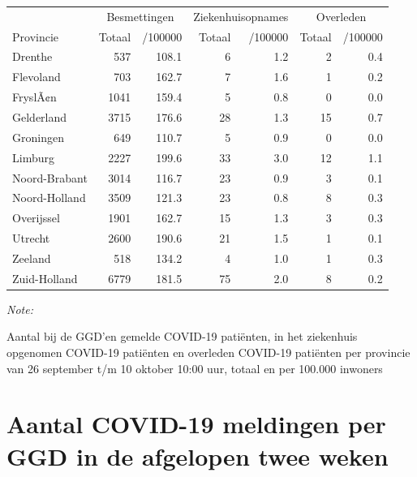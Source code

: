 \documentclass[
  english,
  man,floatsintext]{apa6}
\begin{document}
\begin{table}
\centering
\begin{threeparttable}
\begin{tabular}{lrrrrrr}
\toprule
\multicolumn{1}{c}{ } & \multicolumn{2}{c}{Besmettingen} & \multicolumn{2}{c}{Ziekenhuisopnames} & \multicolumn{2}{c}{Overleden} \\
\cmidrule(l{3pt}r{3pt}){2-3} \cmidrule(l{3pt}r{3pt}){4-5} \cmidrule(l{3pt}r{3pt}){6-7}
Provincie & Totaal & /100000 & Totaal & /100000 & Totaal & /100000\\
\midrule
Drenthe & 537 & 108.1 & 6 & 1.2 & 2 & 0.4\\
Flevoland & 703 & 162.7 & 7 & 1.6 & 1 & 0.2\\
FryslÃ¢n & 1041 & 159.4 & 5 & 0.8 & 0 & 0.0\\
Gelderland & 3715 & 176.6 & 28 & 1.3 & 15 & 0.7\\
Groningen & 649 & 110.7 & 5 & 0.9 & 0 & 0.0\\
Limburg & 2227 & 199.6 & 33 & 3.0 & 12 & 1.1\\
Noord-Brabant & 3014 & 116.7 & 23 & 0.9 & 3 & 0.1\\
Noord-Holland & 3509 & 121.3 & 23 & 0.8 & 8 & 0.3\\
Overijssel & 1901 & 162.7 & 15 & 1.3 & 3 & 0.3\\
Utrecht & 2600 & 190.6 & 21 & 1.5 & 1 & 0.1\\
Zeeland & 518 & 134.2 & 4 & 1.0 & 1 & 0.3\\
Zuid-Holland & 6779 & 181.5 & 75 & 2.0 & 8 & 0.2\\
\bottomrule
\end{tabular}
\begin{tablenotes}
\item \textit{Note: } 
\item Aantal bij de GGD’en gemelde COVID-19 patiënten, in het ziekenhuis opgenomen COVID-19 patiënten en overleden COVID-19 patiënten per provincie van 26 september t/m 10 oktober 10:00 uur, totaal en per 100.000 inwoners
\end{tablenotes}
\end{threeparttable}
\end{table}

\newpage

\hypertarget{aantal-covid-19-meldingen-per-ggd-in-de-afgelopen-twee-weken}{%
\section{Aantal COVID-19 meldingen per GGD in de afgelopen twee weken}\label{aantal-covid-19-meldingen-per-ggd-in-de-afgelopen-twee-weken}}
\end{document}
